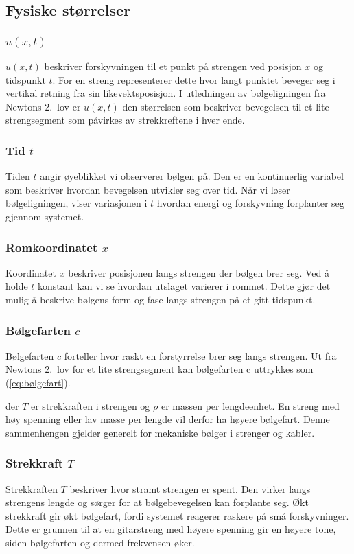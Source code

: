 \subsection{Fysiske størrelser}

\subsubsection{\texorpdfstring{$u(x,t)$}{u(x,t)}}
$u(x,t)$ beskriver forskyvningen til et punkt på strengen ved posisjon $x$ og tidspunkt $t$. 
For en streng representerer dette hvor langt punktet beveger seg i vertikal retning fra sin likevektsposisjon. 
I utledningen av bølgeligningen fra Newtons 2.\ lov er $u(x,t)$ den størrelsen som beskriver bevegelsen til et lite strengsegment som påvirkes av strekkreftene i hver ende.

\subsubsection{Tid \texorpdfstring{$t$}{t}}
Tiden $t$ angir øyeblikket vi observerer bølgen på. 
Den er en kontinuerlig variabel som beskriver hvordan bevegelsen utvikler seg over tid. 
Når vi løser bølgeligningen, viser variasjonen i $t$ hvordan energi og forskyvning forplanter seg gjennom systemet.

\subsubsection{Romkoordinatet \texorpdfstring{$x$}{x}}
Koordinatet $x$ beskriver posisjonen langs strengen der bølgen brer seg. 
Ved å holde $t$ konstant kan vi se hvordan utslaget varierer i rommet. 
Dette gjør det mulig å beskrive bølgens form og fase langs strengen på et gitt tidspunkt.

\subsubsection{Bølgefarten \texorpdfstring{$c$}{c}}
Bølgefarten $c$ forteller hvor raskt en forstyrrelse brer seg langs strengen. 
Ut fra Newtons 2.\ lov for et lite strengsegment kan bølgefarten c uttrykkes som (\ref{eq:bølgefart}).

der $T$ er strekkraften i strengen og $\rho$ er massen per lengdeenhet. 
En streng med høy spenning eller lav masse per lengde vil derfor ha høyere bølgefart. 
Denne sammenhengen gjelder generelt for mekaniske bølger i strenger og kabler.

\subsubsection{Strekkraft \texorpdfstring{$T$}{T}}
Strekkraften $T$ beskriver hvor stramt strengen er spent. 
Den virker langs strengens lengde og sørger for at bølgebevegelsen kan forplante seg. 
Økt strekkraft gir økt bølgefart, fordi systemet reagerer raskere på små forskyvninger. 
Dette er grunnen til at en gitarstreng med høyere spenning gir en høyere tone, siden bølgefarten og dermed frekvensen øker. 
\parencite{NTNUBolgelikning}

